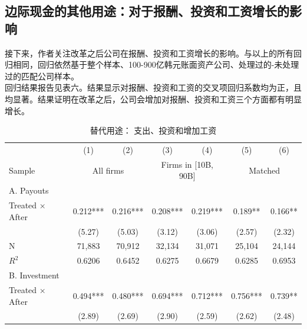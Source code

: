 \documentclass{article}
\begin{document}
\subsection{边际现金的其他用途：对于报酬、投资和工资增长的影响}
\indent 接下来，作者关注改革之后公司在报酬、投资和工资增长的影响。与以上的所有回归相同，回归依然基于整个样本、100-900亿韩元账面资产公司、处理过的-未处理过的匹配公司样本。\\
\indent 回归结果报告见表六。结果显示对报酬、投资和工资的交叉项回归系数均为正，且均显著。结果证明在改革之后，公司会增加对报酬、投资和工资三个方面都有明显增长。\\


\begin{table}[H]
\caption{替代用途： 支出、投资和增加工资}
\centering
\begin{tabular}{lcccccc}
\toprule
                     & (1)           & (2)           & (3)                  & (4)                  & (5)          & (6)          \\ \cmidrule(lr){2-3} \cmidrule(lr){4-5} \cmidrule(lr){6-7}
Sample               & \multicolumn{2}{c}{All firms} & \multicolumn{2}{c}{Firms in {[}10B, 90B{]}} & \multicolumn{2}{c}{Matched} \\ \midrule
A. Payouts           &               &               &                      &                      &              &              \\ \midrule
Treated ×   After    & 0.212***      & 0.216***      & 0.208***             & 0.219***             & 0.189**      & 0.166**      \\
                     & (5.27)        & (5.03)        & (3.12)               & (3.06)               & (2.57)       & (2.32)       \\
N                    & 71,883        & 70,912        & 32,134               & 31,071               & 25,104       & 24,144       \\
$R^2$                   & 0.6206        & 0.6452        & 0.6275               & 0.6679               & 0.6285       & 0.6953       \\ \midrule
B. Investment        &               &               &                      &                      &              &              \\ \midrule
Treated ×   After    & 0.494***      & 0.480***      & 0.694***             & 0.712***             & 0.756***     & 0.739**      \\
                     & (2.89)        & (2.69)        & (2.90)               & (2.59)               & (2.62)       & (2.48)       \\

\end{tabular}
\end{table}
\end{document}
